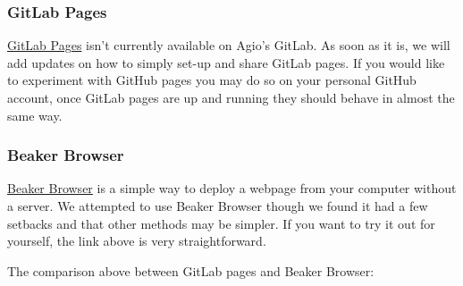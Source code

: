 \documentclass[openany]{book}
\begin{document}
\hypertarget{gitlab-pages}{%
\subsubsection{GitLab Pages}\label{gitlab-pages}}

\href{https://about.gitlab.com/product/pages/}{GitLab Pages} isn't currently available on Agio's GitLab. As soon as it is, we will add updates on how to simply set-up and share GitLab pages. If you would like to experiment with GitHub pages you may do so on your personal GitHub account, once GitLab pages are up and running they should behave in almost the same way.

\hypertarget{beaker-browser}{%
\subsubsection{Beaker Browser}\label{beaker-browser}}

\href{https://beakerbrowser.com/}{Beaker Browser} is a simple way to deploy a webpage from your computer without a server. We attempted to use Beaker Browser though we found it had a few setbacks and that other methods may be simpler. If you want to try it out for yourself, the link above is very straightforward.

The comparison above between GitLab pages and Beaker Browser:
\end{document}
